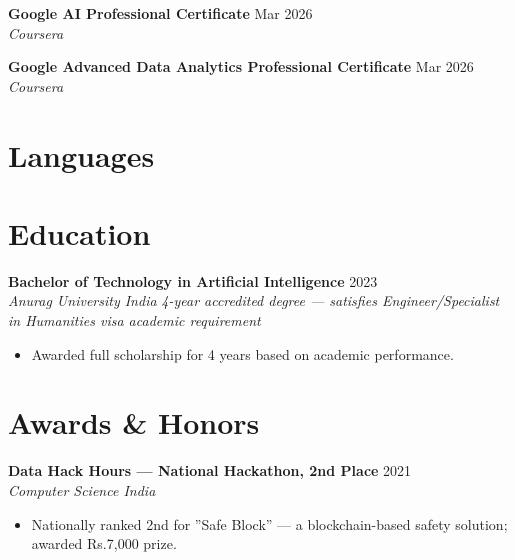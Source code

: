 \documentclass[10pt,letterpaper]{article}
\newcommand{\entry}[3]{%
  \vspace{3pt}\textbf{#1} \hfill #3 \\
  \textit{\small #2}\vspace{1pt}}
\begin{document}
\textbf{Google AI Professional Certificate} \hfill Mar 2026 \\
\textit{Coursera}

\textbf{Google Advanced Data Analytics Professional Certificate} \hfill Mar 2026 \\
\textit{Coursera}

\section{Languages}


\section{Education}

\entry{Bachelor of Technology in Artificial Intelligence}{Anurag University \textbullet{} India}{2023}
\newline\textit{\small 4-year accredited degree --- satisfies Engineer/Specialist in Humanities visa academic requirement}
\begin{itemize}
  \item Awarded full scholarship for 4 years based on academic performance.
\end{itemize}

\section{Awards \& Honors}

\textbf{Data Hack Hours --- National Hackathon, 2nd Place} \hfill 2021 \\
\textit{Computer Science India}
\begin{itemize}
  \item Nationally ranked 2nd for ''Safe Block'' --- a blockchain-based safety solution; awarded Rs.7,000 prize.
\end{itemize}
\end{document}
